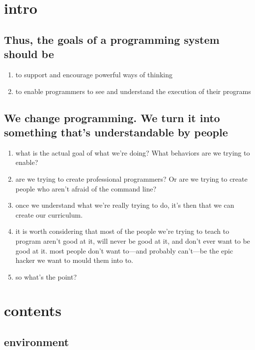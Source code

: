 \section{intro}
\subsection{Thus, the goals of a programming system should be}
\begin{enumerate}
	\item to support and encourage powerful ways of thinking
	\item to enable programmers to see and understand the execution of their programs
\end{enumerate}
\subsection{We change programming. We turn it into something that's understandable by people}
\begin{enumerate}
	\item what is the actual goal of what we're doing? What behaviors are we trying to enable?
	\item are we trying to create professional programmers? Or are we trying to create people who aren't afraid of the command line?
	\item once we understand what we're really trying to do, it's then that we can create our curriculum.
	\item it is worth considering that most of the people we're trying to teach to program aren't good at it, will never be good at it, and don't ever want to be good at it. most people don't want to---and probably can't---be the epic hacker we want to mould them into to.
	\item so what's the point?
\end{enumerate}
\section{contents}
\subsection{environment}
